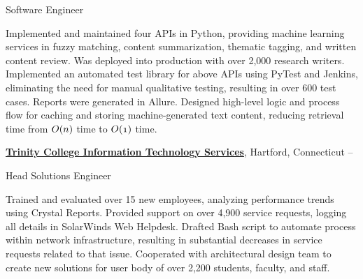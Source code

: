 \documentclass[letterpaper,10pt,oneside]{article}
\begin{document}
\begin{body}
\GapNoBreak
\BulletItem
Software Engineer
\begin{detail}
\SubBulletItem
Implemented and maintained four APIs in Python, providing machine learning services in fuzzy matching, content summarization, thematic tagging, and written content review. Was deployed into production with over 2,000 research writers.
\SubBulletItem
Implemented an automated test library for above APIs using PyTest and Jenkins, eliminating the need for manual qualitative testing, resulting in over 600 test cases. Reports were generated in Allure.
\SubBulletItem
Designed high-level logic and process flow for caching and storing machine-generated text content, reducing retrieval time from $\mathnormal{O(n)}$ time to $\mathnormal{O(1)}$ time.
\end{detail}

\begin{comment}
\BigGapNoBreak
{\textbf{Trinity College Office of Enrollment}},
Hartford, Connecticut
\hfill
\DatestampYMD{2017}{08}{21} --
\DatestampYMD{2018}{05}{18}


\GapNoBreak
\BulletItem
Student Admissions Associate
\begin{detail}
\SubBulletItem
Conducted interviews with over 50 high school students, evaluating their standing as applicants, which resulted in 11 admitted students for the Class of 2022.
\SubBulletItem
Submitted written evaluations on each applicant to be added to applicant’s file.
\SubBulletItem
Led weekly group information sessions for prospective students, families, and admissions visitors.
\SubBulletItem
Participated in on-campus recruitment events, such as panels, special programs, and other projects.
\end{detail}
\end{comment}

\BigGapNoBreak
\href{http://www.trincoll.edu}
{\textbf{Trinity College Information Technology Services}},
Hartford, Connecticut
\hfill
{} --

\GapNoBreak
\BulletItem
Head Solutions Engineer
\begin{detail}
\SubBulletItem
Trained and evaluated over 15 new employees, analyzing performance trends using Crystal Reports.
\SubBulletItem
Provided support on over 4,900 service requests, logging all details in SolarWinds Web Helpdesk.
\SubBulletItem
Drafted Bash script to automate process within network infrastructure, resulting in substantial decreases in service requests related to that issue.
\SubBulletItem
Cooperated with architectural design team to create new solutions for user body of over 2,200 students, faculty, and staff.
\end{detail}


\end{body}
\end{document}
